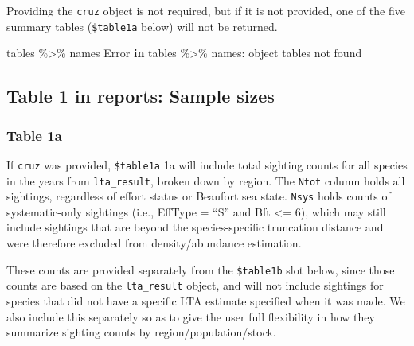 \documentclass[
]{book}
\newenvironment{Shaded}{\begin{snugshade}}{\end{snugshade}}
\newcommand{\ControlFlowTok}[1]{\textcolor[rgb]{0.13,0.29,0.53}{\textbf{#1}}}
\newcommand{\NormalTok}[1]{#1}
\newcommand{\SpecialCharTok}[1]{\textcolor[rgb]{0.00,0.00,0.00}{#1}}
\newcommand{\StringTok}[1]{\textcolor[rgb]{0.31,0.60,0.02}{#1}}
\begin{document}
Providing the \texttt{cruz} object is not required, but if it is not provided, one of the five summary tables (\texttt{\$table1a} below) will not be returned.

\begin{Shaded}
\begin{Highlighting}[]
\NormalTok{tables }\SpecialCharTok{\%\textgreater{}\%}\NormalTok{ names}
\NormalTok{Error }\ControlFlowTok{in}\NormalTok{ tables }\SpecialCharTok{\%\textgreater{}\%}\NormalTok{ names}\SpecialCharTok{:}\NormalTok{ object }\StringTok{\textquotesingle{}tables\textquotesingle{}}\NormalTok{ not found}
\end{Highlighting}
\end{Shaded}

\hypertarget{table-1-in-reports-sample-sizes}{%
\subsection*{Table 1 in reports: Sample sizes}\label{table-1-in-reports-sample-sizes}}

\hypertarget{table-1a}{%
\subsubsection*{Table 1a}\label{table-1a}}

If \texttt{cruz} was provided, \texttt{\$table1a} 1a will include total sighting counts for all species in the years from \texttt{lta\_result}, broken down by region. The \texttt{Ntot} column holds all sightings, regardless of effort status or Beaufort sea state. \texttt{Nsys} holds counts of systematic-only sightings (i.e., EffType = ``S'' and Bft \textless= 6), which may still include sightings that are beyond the species-specific truncation distance and were therefore excluded from density/abundance estimation.

These counts are provided separately from the \texttt{\$table1b} slot below, since those counts are based on the \texttt{lta\_result} object, and will not include sightings for species that did not have a specific LTA estimate specified when it was made. We also include this separately so as to give the user full flexibility in how they summarize sighting counts by region/population/stock.
\end{document}
